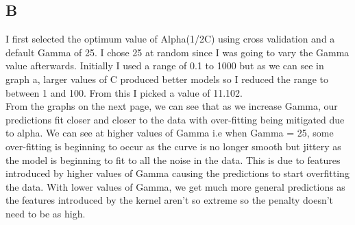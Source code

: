 \documentclass[11pt]{article} %
\begin{document}
\subsection{B}
\begin{figure}[h]
\centering
{}
\qquad
{}
\qquad
\end{figure}
I first selected the optimum value of Alpha(1/2C) using cross validation and a default Gamma of 25. I chose 25 at random since I was going to vary the Gamma value afterwards. Initially I used a range of 0.1 to 1000 but as we can see in graph a, larger values of C produced better models so I reduced the range to between 1 and 100. From this I picked a value of 11.102. \\
From the graphs on the next page, we can see that as we increase Gamma, our predictions fit closer and closer to the data with over-fitting being mitigated due to alpha. We can see at higher values of Gamma i.e when Gamma = 25, some over-fitting is beginning to occur as the curve is no longer smooth but jittery as the model is beginning to fit to all the noise in the data. This is due to features introduced by higher values of Gamma causing the predictions to start overfitting the data. With lower values of Gamma, we get much more general predictions as the features introduced by the kernel aren't so extreme so the penalty doesn't need to be as high.
\end{document}
